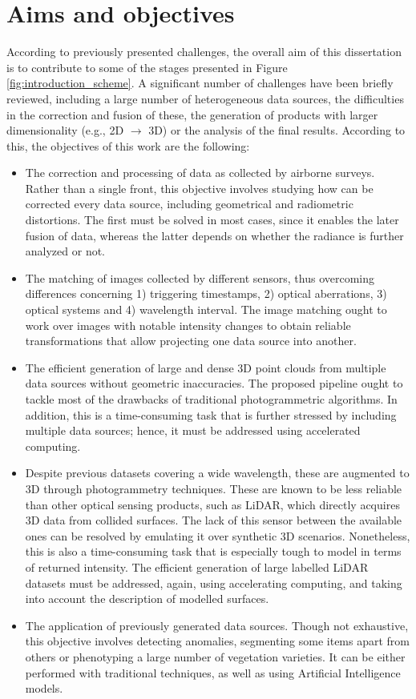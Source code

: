 \section{Aims and objectives}

According to previously presented challenges, the overall aim of this dissertation is to contribute to some of the stages presented in Figure \ref{fig:introduction_scheme}. A significant number of challenges have been briefly reviewed, including a large number of heterogeneous data sources, the difficulties in the correction and fusion of these, the generation of products with larger dimensionality (e.g., 2D $\rightarrow$ 3D) or the analysis of the final results. According to this, the objectives of this work are the following:
\begin{itemize}
    \item The correction and processing of data as collected by airborne surveys. Rather than a single front, this objective involves studying how can be corrected every data source, including geometrical and radiometric distortions. The first must be solved in most cases, since it enables the later fusion of data, whereas the latter depends on whether the radiance is further analyzed or not.
    \item The matching of images collected by different sensors, thus overcoming differences concerning 1) triggering timestamps, 2) optical aberrations, 3) optical systems and 4) wavelength interval. The image matching ought to work over images with notable intensity changes to obtain reliable transformations that allow projecting one data source into another. 
    \item The efficient generation of large and dense 3D point clouds from multiple data sources without geometric inaccuracies. The proposed pipeline ought to tackle most of the drawbacks of traditional photogrammetric algorithms. In addition, this is a time-consuming task that is further stressed by including multiple data sources; hence, it must be addressed using accelerated computing.
    \item Despite previous datasets covering a wide wavelength, these are augmented to 3D through photogrammetry techniques. These are known to be less reliable than other optical sensing products, such as LiDAR, which directly acquires 3D data from collided surfaces. The lack of this sensor between the available ones can be resolved by emulating it over synthetic 3D scenarios. Nonetheless, this is also a time-consuming task that is especially tough to model in terms of returned intensity. The efficient generation of large labelled LiDAR datasets must be addressed, again, using accelerating computing, and taking into account the description of modelled surfaces.
    \item The application of previously generated data sources. Though not exhaustive, this objective involves detecting anomalies, segmenting some items apart from others or phenotyping a large number of vegetation varieties. It can be either performed with traditional techniques, as well as using Artificial Intelligence models.
\end{itemize}

